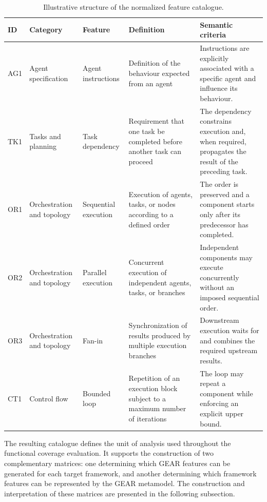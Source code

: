 \begin{table}[t]
    \centering
    \caption{Illustrative structure of the normalized feature catalogue.}
    \label{tab:functional-catalogue-example}
    \footnotesize
    \begin{tabularx}{\textwidth}{
        @{}
        l
        p{}
        p{}
        >{\raggedright\arraybackslash}X
        p{}
        @{}
    }
        \toprule
        \textbf{ID}
        & \textbf{Category}
        & \textbf{Feature}
        & \textbf{Definition}
        & \textbf{Semantic criteria} \\
        \midrule

        AG1
        & Agent specification
        & Agent instructions
        & Definition of the behaviour expected from an agent
        & Instructions are explicitly associated with a specific agent and
        influence its behaviour. \\

        TK1
        & Tasks and planning
        & Task dependency
        & Requirement that one task be completed before another task can
        proceed
        & The dependency constrains execution and, when required, propagates
        the result of the preceding task. \\

        OR1
        & Orchestration and topology
        & Sequential execution
        & Execution of agents, tasks, or nodes according to a defined order
        & The order is preserved and a component starts only after its
        predecessor has completed. \\

        OR2
        & Orchestration and topology
        & Parallel execution
        & Concurrent execution of independent agents, tasks, or branches
        & Independent components may execute concurrently without an imposed
        sequential order. \\

        OR3
        & Orchestration and topology
        & Fan-in
        & Synchronization of results produced by multiple execution branches
        & Downstream execution waits for and combines the required upstream
        results. \\

        CT1
        & Control flow
        & Bounded loop
        & Repetition of an execution block subject to a maximum number of
        iterations
        & The loop may repeat a component while enforcing an explicit upper
        bound. \\

        \bottomrule
    \end{tabularx}
\end{table}

The resulting catalogue defines the unit of analysis used throughout the
functional coverage evaluation. It supports the construction of two
complementary matrices: one determining which GEAR features can be generated
for each target framework, and another determining which framework features
can be represented by the GEAR metamodel. The construction and interpretation
of these matrices are presented in the following subsection.

